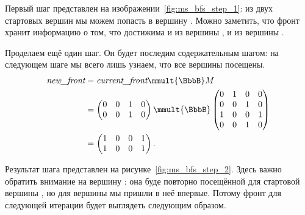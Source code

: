 \begin{example}
    Первый шаг представлен на изображении~\ref{fig:ms_bfs_step_1}: из двух стартовых вершин мы можем попасть в вершину .
    Можно заметить, что фронт хранит информацию о том, что  достижима и из вершины , и из вершины .

    \begin{marginfigure}
        \begin{center}
            \resizebox{\marginparwidth}{!}{}
        \end{center}
        \caption{Обход в ширину с несколькими стартовыми вершинами, шаг второй}
        \label{fig:ms_bfs_step_2}
    \end{marginfigure}

    Проделаем ещё один шаг.
    Он будет последим содержательным шагом: на следующем шаге мы всего лишь узнаем, что все вершины посещены.
    \begin{align*}
        \emph{new\_front} & = \emph{current\_front} \mmult{\BbbB} M \\
                          & =
        \begin{pmatrix}
            0 & 0 & 1 & 0 \\
            0 & 0 & 1 & 0
        \end{pmatrix} \mmult{\BbbB}
        \begin{pmatrix}
            0 & 1 & 0 & 0 \\
            0 & 0 & 1 & 0 \\
            1 & 0 & 0 & 1 \\
            0 & 0 & 1 & 0
        \end{pmatrix}        \\ &=
        \begin{pmatrix}
            1 & 0 & 0 & 1 \\
            1 & 0 & 0 & 1
        \end{pmatrix}.
    \end{align*}



    Результат шага представлен на рисунке~\ref{fig:ms_bfs_step_2}.
    Здесь важно обратить внимание на вершину : она буде повторно посещённой для стартовой вершины , но для вершины  мы пришли в неё впервые.
    Потому фронт для следующей итерации будет выглядеть следующим образом.


\end{example}
